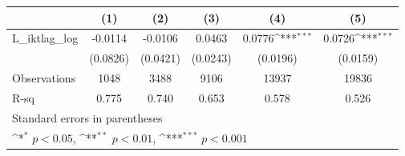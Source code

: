 {
\def\sym#1{\ifmmode^{#1}\else\(^{#1}\)\fi}
\begin{tabular}{l*{5}{c}}
\hline\hline
                &\multicolumn{1}{c}{(1)}         &\multicolumn{1}{c}{(2)}         &\multicolumn{1}{c}{(3)}         &\multicolumn{1}{c}{(4)}         &\multicolumn{1}{c}{(5)}         \\
\hline
L\_iktlag\_log    &  -0.0114         &  -0.0106         &   0.0463         &   0.0776\sym{***}&   0.0726\sym{***}\\
                & (0.0826)         & (0.0421)         & (0.0243)         & (0.0196)         & (0.0159)         \\
\hline
Observations    &     1048         &     3488         &     9106         &    13937         &    19836         \\
R-sq            &    0.775         &    0.740         &    0.653         &    0.578         &    0.526         \\
\hline\hline
\multicolumn{6}{l}{\footnotesize Standard errors in parentheses}\\
\multicolumn{6}{l}{\footnotesize \sym{*} \(p<0.05\), \sym{**} \(p<0.01\), \sym{***} \(p<0.001\)}\\
\end{tabular}
}

